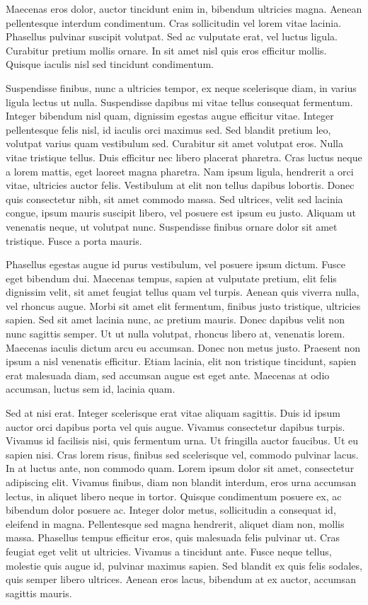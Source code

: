 Maecenas eros dolor, auctor tincidunt enim in, bibendum ultricies magna. Aenean pellentesque interdum condimentum. Cras sollicitudin vel lorem vitae lacinia. Phasellus pulvinar suscipit volutpat. Sed ac vulputate erat, vel luctus ligula. Curabitur pretium mollis ornare. In sit amet nisl quis eros efficitur mollis. Quisque iaculis nisl sed tincidunt condimentum.

Suspendisse finibus, nunc a ultricies tempor, ex neque scelerisque diam, in varius ligula lectus ut nulla. Suspendisse dapibus mi vitae tellus consequat fermentum. Integer bibendum nisl quam, dignissim egestas augue efficitur vitae. Integer pellentesque felis nisl, id iaculis orci maximus sed. Sed blandit pretium leo, volutpat varius quam vestibulum sed. Curabitur sit amet volutpat eros. Nulla vitae tristique tellus. Duis efficitur nec libero placerat pharetra. Cras luctus neque a lorem mattis, eget laoreet magna pharetra. Nam ipsum ligula, hendrerit a orci vitae, ultricies auctor felis. Vestibulum at elit non tellus dapibus lobortis. Donec quis consectetur nibh, sit amet commodo massa. Sed ultrices, velit sed lacinia congue, ipsum mauris suscipit libero, vel posuere est ipsum eu justo. Aliquam ut venenatis neque, ut volutpat nunc. Suspendisse finibus ornare dolor sit amet tristique. Fusce a porta mauris.

Phasellus egestas augue id purus vestibulum, vel posuere ipsum dictum. Fusce eget bibendum dui. Maecenas tempus, sapien at vulputate pretium, elit felis dignissim velit, sit amet feugiat tellus quam vel turpis. Aenean quis viverra nulla, vel rhoncus augue. Morbi sit amet elit fermentum, finibus justo tristique, ultricies sapien. Sed sit amet lacinia nunc, ac pretium mauris. Donec dapibus velit non nunc sagittis semper. Ut ut nulla volutpat, rhoncus libero at, venenatis lorem. Maecenas iaculis dictum arcu eu accumsan. Donec non metus justo. Praesent non ipsum a nisl venenatis efficitur. Etiam lacinia, elit non tristique tincidunt, sapien erat malesuada diam, sed accumsan augue est eget ante. Maecenas at odio accumsan, luctus sem id, lacinia quam.

Sed at nisi erat. Integer scelerisque erat vitae aliquam sagittis. Duis id ipsum auctor orci dapibus porta vel quis augue. Vivamus consectetur dapibus turpis. Vivamus id facilisis nisi, quis fermentum urna. Ut fringilla auctor faucibus. Ut eu sapien nisi. Cras lorem risus, finibus sed scelerisque vel, commodo pulvinar lacus. In at luctus ante, non commodo quam.
Lorem ipsum dolor sit amet, consectetur adipiscing elit. Vivamus finibus, diam non blandit interdum, eros urna accumsan lectus, in aliquet libero neque in tortor. Quisque condimentum posuere ex, ac bibendum dolor posuere ac. Integer dolor metus, sollicitudin a consequat id, eleifend in magna. Pellentesque sed magna hendrerit, aliquet diam non, mollis massa. Phasellus tempus efficitur eros, quis malesuada felis pulvinar ut. Cras feugiat eget velit ut ultricies. Vivamus a tincidunt ante. Fusce neque tellus, molestie quis augue id, pulvinar maximus sapien. Sed blandit ex quis felis sodales, quis semper libero ultrices. Aenean eros lacus, bibendum at ex auctor, accumsan sagittis mauris.

